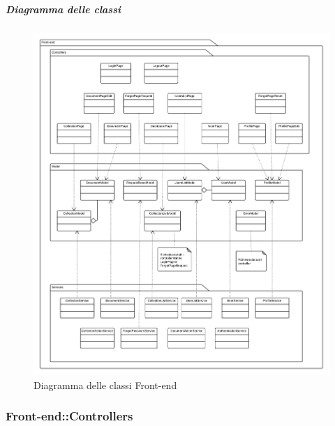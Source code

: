    \subparagraph{Diagramma delle classi}
    \begin{figure}[H] 
      \begin{center} 
        \includegraphics[width=\textwidth]{uml/Front-end-Diagramma delle classi.png}  
        \caption{Diagramma delle classi Front-end}
      \end{center}  
    \end{figure} 
    
  \subsubsection{Front-end::Controllers}
